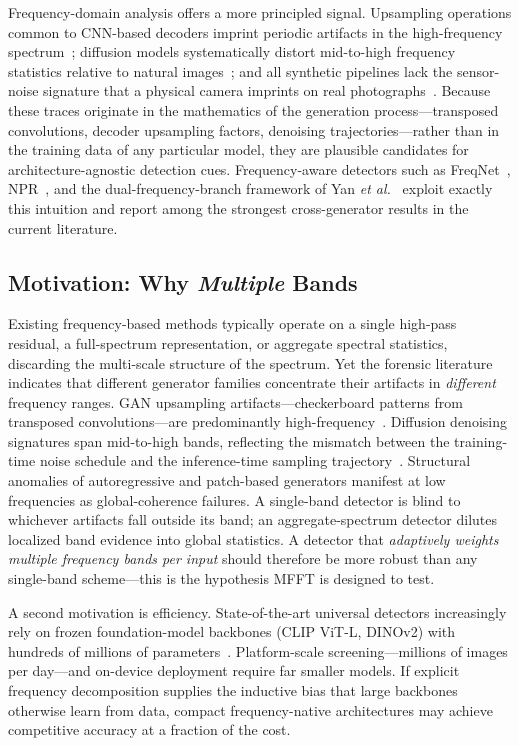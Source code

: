 \documentclass[journal]{IEEEtran}
\begin{document}
Frequency-domain analysis offers a more principled signal. Upsampling operations common to CNN-based decoders imprint periodic artifacts in the high-frequency spectrum~\cite{zhang2019wifs,durall2020,frank2020}; diffusion models systematically distort mid-to-high frequency statistics relative to natural images~\cite{corvi2023,ricker2024}; and all synthetic pipelines lack the sensor-noise signature that a physical camera imprints on real photographs~\cite{cozzolino2019}. Because these traces originate in the mathematics of the generation process---transposed convolutions, decoder upsampling factors, denoising trajectories---rather than in the training data of any particular model, they are plausible candidates for architecture-agnostic detection cues. Frequency-aware detectors such as FreqNet~\cite{tan2024freqnet}, NPR~\cite{tan2024npr}, and the dual-frequency-branch framework of Yan \textit{et al.}~\cite{yan2026dualfreq} exploit exactly this intuition and report among the strongest cross-generator results in the current literature.

\subsection{Motivation: Why \emph{Multiple} Bands}
Existing frequency-based methods typically operate on a single high-pass residual, a full-spectrum representation, or aggregate spectral statistics, discarding the multi-scale structure of the spectrum. Yet the forensic literature indicates that different generator families concentrate their artifacts in \emph{different} frequency ranges. GAN upsampling artifacts---checkerboard patterns from transposed convolutions---are predominantly high-frequency~\cite{zhang2019wifs,durall2020}. Diffusion denoising signatures span mid-to-high bands, reflecting the mismatch between the training-time noise schedule and the inference-time sampling trajectory~\cite{corvi2023}. Structural anomalies of autoregressive and patch-based generators manifest at low frequencies as global-coherence failures. A single-band detector is blind to whichever artifacts fall outside its band; an aggregate-spectrum detector dilutes localized band evidence into global statistics. A detector that \emph{adaptively weights multiple frequency bands per input} should therefore be more robust than any single-band scheme---this is the hypothesis MFFT is designed to test.

A second motivation is efficiency. State-of-the-art universal detectors increasingly rely on frozen foundation-model backbones (CLIP ViT-L, DINOv2) with hundreds of millions of parameters~\cite{ojha2023,tan2025c2pclip,yan2025effort}. Platform-scale screening---millions of images per day---and on-device deployment require far smaller models. If explicit frequency decomposition supplies the inductive bias that large backbones otherwise learn from data, compact frequency-native architectures may achieve competitive accuracy at a fraction of the cost.
\end{document}
